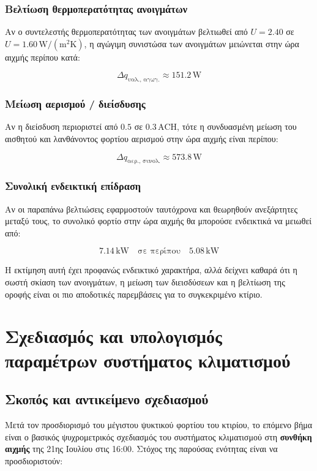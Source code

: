 \documentclass[12pt,a4paper]{article}
\begin{document}
\subsubsection{Βελτίωση θερμοπερατότητας ανοιγμάτων}

Αν ο συντελεστής θερμοπερατότητας των ανοιγμάτων βελτιωθεί από
\(U = 2.40\) σε \(U = 1.60\,\mathrm{W/(m^2K)}\), η αγώγιμη συνιστώσα των ανοιγμάτων
μειώνεται στην ώρα αιχμής περίπου κατά:

\[
\Delta q_{\text{υαλ., αγωγ.}} \approx 151.2\,\mathrm{W}
\]

\subsubsection{Μείωση αερισμού / διείσδυσης}

Αν η διείσδυση περιοριστεί από \(0.5\) σε \(0.3\,\mathrm{ACH}\), τότε η συνδυασμένη
μείωση του αισθητού και λανθάνοντος φορτίου αερισμού στην ώρα αιχμής είναι περίπου:

\[
\Delta q_{\text{αερ., συνολ.}} \approx 573.8\,\mathrm{W}
\]

\subsubsection{Συνολική ενδεικτική επίδραση}

Αν οι παραπάνω βελτιώσεις εφαρμοστούν ταυτόχρονα και θεωρηθούν ανεξάρτητες μεταξύ τους,
το συνολικό φορτίο στην ώρα αιχμής θα μπορούσε ενδεικτικά να μειωθεί από:

\[
7.14\,\mathrm{kW}
\quad \text{σε περίπου} \quad
5.08\,\mathrm{kW}
\]

Η εκτίμηση αυτή έχει προφανώς ενδεικτικό χαρακτήρα, αλλά δείχνει καθαρά ότι η σωστή
σκίαση των ανοιγμάτων, η μείωση των διεισδύσεων και η βελτίωση της οροφής είναι οι
πιο αποδοτικές παρεμβάσεις για το συγκεκριμένο κτίριο.

\section{Σχεδιασμός και υπολογισμός παραμέτρων συστήματος κλιματισμού}

\subsection{Σκοπός και αντικείμενο σχεδιασμού}

Μετά τον προσδιορισμό του μέγιστου ψυκτικού φορτίου του κτιρίου, το επόμενο βήμα
είναι ο βασικός ψυχρομετρικός σχεδιασμός του συστήματος κλιματισμού στη
\textbf{συνθήκη αιχμής} της 21ης Ιουλίου στις 16:00. Στόχος της παρούσας ενότητας
είναι να προσδιοριστούν:
\end{document}
